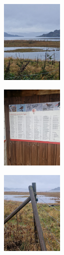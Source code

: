 \documentclass[english,twocolumn]{article}
\begin{document}
\begin{figure}[t]
\centering
\begin{subfigure}{0.3\textwidth}
\centering
\includegraphics[width=\textwidth,height=4cm,keepaspectratio]{01_wetland_landscape_mountains.jpg}
\caption{}
\end{subfigure}
\hfill
\begin{subfigure}{0.3\textwidth}
\centering
\includegraphics[width=\textwidth,height=4cm,keepaspectratio]{02_species_information_board.jpg}
\caption{}
\end{subfigure}
\hfill
\begin{subfigure}{0.3\textwidth}
\centering
\includegraphics[width=\textwidth,height=4cm,keepaspectratio]{03_deployment_location_fence.jpg}
\caption{}
\end{subfigure}

\vspace{0.3cm}


\end{figure}
\end{document}
